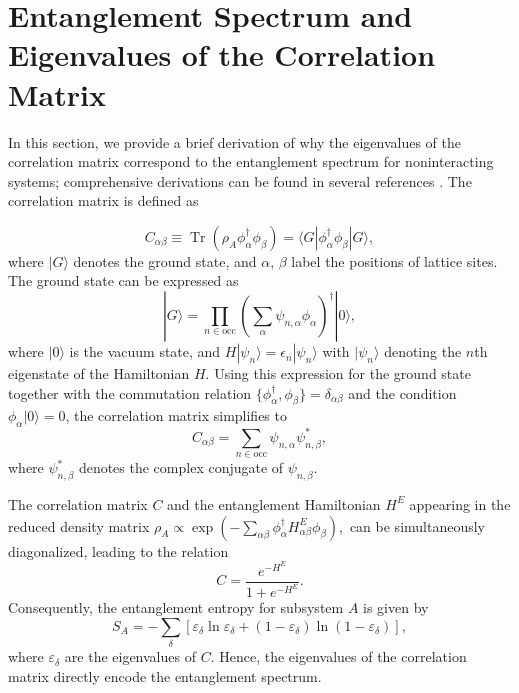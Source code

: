 \documentclass[twocolumn,english,prl,epsfig,rotate,showpacs,aps, superscriptaddress]{revtex4-2}
\begin{document}
\section{Entanglement Spectrum and Eigenvalues of the Correlation Matrix}
In this section, we provide a brief derivation of why the eigenvalues of the correlation matrix correspond to the entanglement spectrum for noninteracting systems; comprehensive derivations can be found in several references \cite{peschel2009reduced,chang2020entanglement}. The correlation matrix is defined as

\begin{equation}
C_{\alpha\beta} \equiv \operatorname{Tr}(\rho_A \phi_{\alpha}^\dagger \phi_{\beta}) = \langle G | \phi_{\alpha}^\dagger \phi_\beta | G \rangle,
\label{eq:s1}
\end{equation}
where $| G \rangle$ denotes the ground state, and $\alpha$, $\beta$ label the positions of lattice sites. The ground state can be expressed as
\begin{equation}
| G \rangle = \prod_{n \in \text{occ}} \left( \sum_{\alpha} \psi_{n,\alpha} \phi_{\alpha} \right)^\dagger | 0 \rangle,
\label{eq:s2}
\end{equation}
where $| 0 \rangle$ is the vacuum state, and $H | \psi_n \rangle = \epsilon_n | \psi_n \rangle$ with $| \psi_n \rangle$ denoting the $n$th eigenstate of the Hamiltonian $H$. Using this expression for the ground state together with the commutation relation $\{\phi_{\alpha}^\dagger , \phi_{\beta}\}=\delta_{\alpha\beta}$ and the condition $\phi_{\alpha}| 0\rangle = 0$, the correlation matrix simplifies to
\begin{equation}
C_{\alpha\beta} = \sum_{n \in \text{occ}} \psi_{n,\alpha} \psi_{n,\beta}^*,
\label{eq:s3}
\end{equation}
where $\psi_{n,\beta}^*$ denotes the complex conjugate of $\psi_{n,\beta}$.

The correlation matrix $C$ and the entanglement Hamiltonian $H^E$ appearing in the reduced density matrix $\rho_A \propto \exp\left(-\sum_{\alpha\beta} \phi_{\alpha}^\dagger H_{\alpha\beta}^{E} \phi_\beta\right),$ can be simultaneously diagonalized, leading to the relation
\begin{equation}
C = \frac{e^{-H^E}}{1 + e^{-H^E}}.
\label{eq:s4}
\end{equation}
Consequently, the entanglement entropy for subsystem $A$ is given by
\begin{equation}
S_A = - \sum_{\delta} \left[ \varepsilon_\delta \ln \varepsilon_\delta + (1 - \varepsilon_\delta) \ln (1 - \varepsilon_\delta) \right],
\label{eq:s5}
\end{equation}
where $\varepsilon_\delta$ are the eigenvalues of $C$. Hence, the eigenvalues of the correlation matrix directly encode the entanglement spectrum.
\label{app1}
\end{document}
